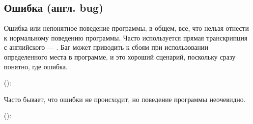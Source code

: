\documentclass[letterpaper,10pt,russian]{sphinxmanual}
\begin{document}
\subsection{Ошибка (англ. bug)}
\label{\detokenize{educational_materials/terms/content:bug}}
\sphinxAtStartPar
Ошибка или непонятное поведение программы, в общем, все, что нельзя отнести к нормальному поведению программы. Часто используется прямая транскрипция с английского — . Баг может приводить к сбоям при использовании определенного места в программе, и это хороший сценарий, поскольку сразу понятно, где ошибка. 

\sphinxAtStartPar
():

\begin{sphinxVerbatim}[commandchars=\\\{\}]
 

     

      
          

   
      
\end{sphinxVerbatim}

\sphinxAtStartPar
Часто бывает, что ошибки не происходит, но поведение программы неочевидно.

\sphinxAtStartPar
():
\end{document}
